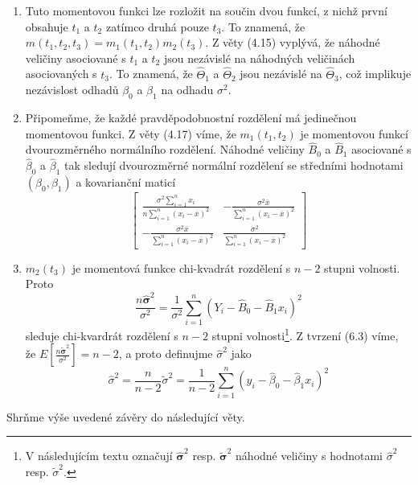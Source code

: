 \begin{enumerate}
\item Tuto momentovou funkci lze rozložit na součin dvou funkcí, z nichž první obsahuje $t_1$ a $t_2$ zatímco druhá pouze $t_3$. To znamená, že $m(t_1, t_2, t_3) = m_1(t_1, t_2)m_2(t_3)$. Z věty (4.15) vyplývá, že náhodné veličiny asociované s $t_1$ a $t_2$ jsou nezávislé na náhodných veličinách asociovaných s $t_3$. To znamená, že $\hat{\Theta}_1$ a $\hat{\Theta}_2$ jsou nezávislé na $\hat{\Theta}_3$, což implikuje nezávislost odhadů $\beta_0$ a $\beta_1$ na odhadu $\sigma^2$.
\item Připomeňme, že každé pravděpodobnostní rozdělení má jedinečnou momentovou funkci. Z věty (4.17) víme, že $m_1(t_1, t_2)$ je momentovou funkcí dvourozměrného normálního rozdělení. Náhodné veličiny $\hat{B}_0$ a $\hat{B}_1$ asociované s $\hat{\beta}_0$ a $\hat{\beta}_1$ tak sledují dvourozměrné normální rozdělení se středními hodnotami $(\beta_0, \beta_1)$ a kovarianční maticí
\begin{equation}
\begin{bmatrix}
\frac{\sigma^2 \sum_{i = 1}^n x_i}{n \sum_{i = 1}^n (x_i - \overline{x})^2} & -\frac{\sigma^2 \overline{x}}{\sum_{i = 1}^n (x_i - \overline{x})^2}\\
-\frac{\sigma^2 \overline{x}}{\sum_{i = 1}^n (x_i - \overline{x})^2} & \frac{\sigma^2}{\sum_{i = 1}^n (x_i - \overline{x})^2}
\end{bmatrix}
\end{equation}
\item $m_2(t_3)$ je momentová funkce chi-kvadrát rozdělení s $n - 2$ stupni volnosti. Proto
\begin{equation*}
\frac{n \hat{\boldsymbol\sigma}^2}{\sigma^2} = \frac{1}{\sigma^2}\sum_{i = 1}^n (Y_i - \hat{B}_0 - \hat{B}_1 x_i)^2
\end{equation*}
sleduje chi-kvardrát rozdělení s $n - 2$ stupni volnosti\footnote{V následujícím textu označují $\hat{\boldsymbol\sigma}^2$ resp. $\tilde{\boldsymbol\sigma}^2$ náhodné veličiny s hodnotami $\hat{\sigma}^2$ resp. $\tilde{\sigma}^2$.}. Z tvrzení (6.3) víme, že $E\left[\frac{n \tilde{\boldsymbol\sigma}^2}{\sigma^2}\right] = n - 2$, a proto definujme $\hat{\sigma}^2$ jako
\begin{equation*}
\hat{\sigma}^2 = \frac{n}{n - 2}\tilde{\sigma}^2 = \frac{1}{n - 2} \sum_{i = 1}^n (y_i - \hat{\beta}_0 - \hat{\beta}_1 x_i)^2
\end{equation*}
\end{enumerate}
Shrňme výše uvedené závěry do následující věty.

